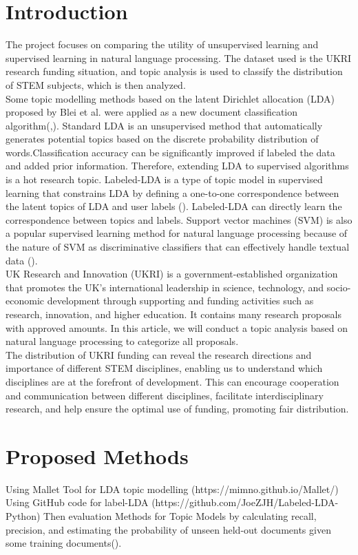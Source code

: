 \documentclass{article}
\begin{document}
\section*{Introduction}
The project focuses on comparing the utility of unsupervised learning and supervised learning in natural language processing. The dataset used is the UKRI research funding situation, and topic analysis is used to classify the distribution of STEM subjects, which is then analyzed.\\
Some topic modelling methods based on the latent Dirichlet allocation (LDA) proposed by Blei et al. were applied as a new document classification algorithm(\cite{blei2003latent},\cite{blei2012probabilistic}).
Standard LDA is an unsupervised method that automatically generates potential topics based on the discrete probability distribution of words.Classification accuracy can be significantly improved if labeled the data and added prior information. 
Therefore, extending LDA to supervised algorithms is a hot research topic. Labeled-LDA is a type of topic model in supervised learning that constrains LDA by defining a one-to-one correspondence between the latent topics of LDA and user labels (\cite{ramage2009labeled}). Labeled-LDA can directly learn the correspondence between topics and labels. 
Support vector machines (SVM) is also a popular supervised learning method for natural language processing because of the nature of SVM as discriminative classifiers that can effectively handle textual data (\cite{10.1162/089120103322753374}).\\
UK Research and Innovation (UKRI) is a government-established organization that promotes the UK's international leadership in science, technology, and socio-economic development through supporting and funding activities such as research, innovation, and higher education. It contains many research proposals with approved amounts. In this article, we will conduct a topic analysis based on natural language processing to categorize all proposals.
\\The distribution of UKRI funding can reveal the research directions and importance of different STEM disciplines, enabling us to understand which disciplines are at the forefront of development. This can encourage cooperation and communication between different disciplines, facilitate interdisciplinary research, and help ensure the optimal use of funding, promoting fair distribution.



\section*{Proposed Methods}
Using Mallet Tool for LDA topic modelling (https://mimno.github.io/Mallet/)\\
Using GitHub code for label-LDA (https://github.com/JoeZJH/Labeled-LDA-Python)
Then evaluation Methods for Topic Models by calculating recall, precision, and estimating the
probability of unseen held-out documents given some
training documents(\cite{wallach2009evaluation}).
\end{document}
